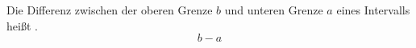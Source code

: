 Die Differenz zwischen der oberen Grenze $b$ und unteren Grenze $a$ eines Intervalls heißt .
$$b-a$$